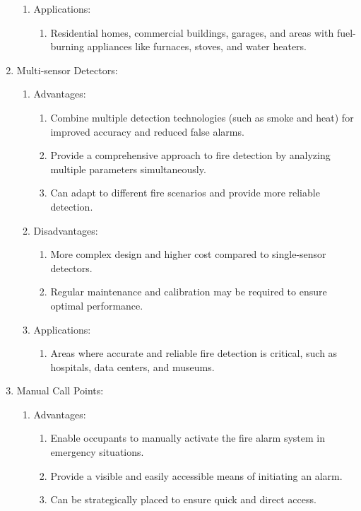 \documentclass{article}
\begin{document}
\begin{enumerate}
\begin{enumerate}
    \item Applications:
    \begin{enumerate}
      \item Residential homes, commercial buildings, garages, and areas with fuel-burning appliances like furnaces, stoves, and water heaters.
    \end{enumerate}

  \end{enumerate}
  
  \item Multi-sensor Detectors:
  \begin{enumerate}
    \item Advantages:
    \begin{enumerate}

      \item Combine multiple detection technologies (such as smoke and heat) for improved accuracy and reduced false alarms.
      \item Provide a comprehensive approach to fire detection by analyzing multiple parameters simultaneously.
      \item Can adapt to different fire scenarios and provide more reliable detection.
    \end{enumerate}
    \item Disadvantages:
      \begin{enumerate}
      \item More complex design and higher cost compared to single-sensor detectors.
      \item Regular maintenance and calibration may be required to ensure optimal performance.
      \end{enumerate}
      \item Applications:
      \begin{enumerate}
        \item Areas where accurate and reliable fire detection is critical, such as hospitals, data centers, and museums.
      \end{enumerate}
  
  \end{enumerate}
  
  \item Manual Call Points:
  \begin{enumerate}
    \item Advantages:
    \begin{enumerate}
      \item Enable occupants to manually activate the fire alarm system in emergency situations.
      \item Provide a visible and easily accessible means of initiating an alarm.
      \item Can be strategically placed to ensure quick and direct access.
    \end{enumerate}
    

\end{enumerate}
\end{enumerate}
\end{document}
